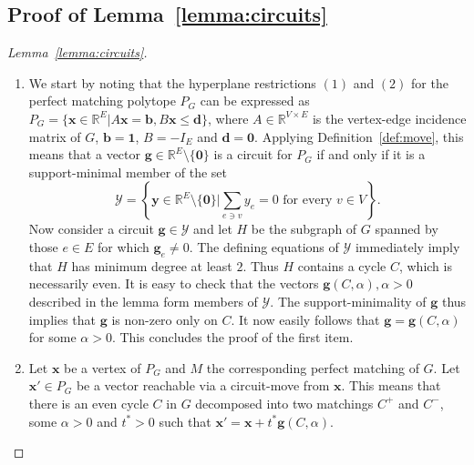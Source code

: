 \documentclass[runningheads]{llncs}
\begin{document}
\subsection{Proof of Lemma~\ref{lemma:circuits}}
\begin{proof}[Lemma~\ref{lemma:circuits}]
\begin{enumerate}
    \item We start by noting that the hyperplane restrictions $(1)$ and $(2)$ for the perfect matching polytope $P_G$ can be expressed as $P_G=\{\mathbf{x} \in \mathbb{R}^E|A\mathbf{x}=\mathbf{b}, B\mathbf{x} \le \mathbf{d}\}$, where $A \in \mathbb{R}^{V \times E}$ is the vertex-edge incidence matrix of $G$, $\mathbf{b}=\mathbf{1}$, $B=-I_E$ and $\mathbf{d}=\mathbf{0}$. Applying Definition~\ref{def:move}, this means that a vector $\mathbf{g} \in \mathbb{R}^E\setminus\{\mathbf{0}\}$ is a circuit for $P_G$ if and only if it is a support-minimal member of the set $$\mathcal{Y}=\left\{\mathbf{y}\in \mathbb{R}^E\setminus\{\mathbf{0}\}\bigg\vert\sum_{e \ni v}{y_e}=0 \text{ for every } v \in V\right\}.$$
    Now consider a circuit $\mathbf{g} \in \mathcal{Y}$ and let $H$ be the subgraph of $G$ spanned by those $e \in E$ for which $\mathbf{g}_e \neq 0$. The defining equations of $\mathcal{Y}$ immediately imply that $H$ has minimum degree at least $2$. Thus $H$ contains a cycle $C$, which is necessarily even. It is easy to check that the vectors $\mathbf{g}(C,\alpha), \alpha > 0$ described in the lemma form members of $\mathcal{Y}$. The support-minimality of $\mathbf{g}$ thus implies that $\mathbf{g}$ is non-zero only on $C$. It now easily follows that $\mathbf{g}=\mathbf{g}(C,\alpha)$ for some $\alpha>0$. This concludes the proof of the first item. 
    \item Let $\mathbf{x}$ be a vertex of $P_G$ and $M$ the corresponding perfect matching of $G$. Let $\mathbf{x}' \in P_G$ be a vector reachable via a circuit-move from $\mathbf{x}$. This means that there is an even cycle $C$ in $G$ decomposed into two matchings $C^+$ and $C^-$, some $\alpha>0$ and $t^\ast > 0$ such that $\mathbf{x}'=\mathbf{x}+t^\ast\mathbf{g}(C,\alpha)$. 

\end{enumerate}
\end{proof}
\end{document}
